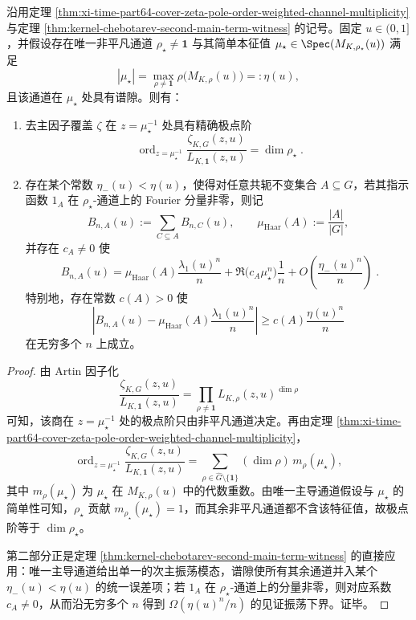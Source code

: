 \begin{theorem}[主导非平凡通道的极点阶与见证振荡]\label{thm:xi-time-part64ac-dominant-channel-pole-order-witness-oscillation}
沿用定理 \ref{thm:xi-time-part64-cover-zeta-pole-order-weighted-channel-multiplicity} 与定理 \ref{thm:kernel-chebotarev-second-main-term-witness} 的记号。固定 \(u\in(0,1]\)，并假设存在唯一非平凡通道 \(\rho_\star\neq \mathbf{1}\) 与其简单本征值 \(\mu_\star\in\Spec(M_{K,\rho_\star}(u))\) 满足
\[
|\mu_\star|
=
\max_{\rho\neq \mathbf{1}}\rho\!\bigl(M_{K,\rho}(u)\bigr)
=:\eta(u),
\]
且该通道在 \(\mu_\star\) 处具有谱隙。则有：
\begin{enumerate}
  \item 去主因子覆盖 \(\zeta\) 在 \(z=\mu_\star^{-1}\) 处具有精确极点阶
  \[
  \boxed{\;
  \operatorname{ord}_{z=\mu_\star^{-1}}
  \frac{\zeta_{K,G}(z,u)}{L_{K,\mathbf{1}}(z,u)}
  =
  \dim\rho_\star\; }.
  \]
  \item 存在某个常数 \(\eta_-(u)<\eta(u)\)，使得对任意共轭不变集合 \(A\subseteq G\)，若其指示函数 \(1_A\) 在 \(\rho_\star\)-通道上的 Fourier 分量非零，则记
  \[
  B_{n,A}(u):=\sum_{C\subseteq A}B_{n,C}(u),
  \qquad
  \mu_{\mathrm{Haar}}(A):=\frac{|A|}{|G|},
  \]
  并存在 \(c_A\neq 0\) 使
  \[
  \boxed{\;
  B_{n,A}(u)
  =
  \mu_{\mathrm{Haar}}(A)\frac{\lambda_1(u)^n}{n}
  +
  \Re\!\bigl(c_A\mu_\star^n\bigr)\frac1n
  +
  O\!\left(\frac{\eta_-(u)^n}{n}\right)\; }.
  \]
  特别地，存在常数 \(c(A)>0\) 使
  \[
  \boxed{\;
  \left|B_{n,A}(u)-\mu_{\mathrm{Haar}}(A)\frac{\lambda_1(u)^n}{n}\right|
  \ge
  c(A)\frac{\eta(u)^n}{n}\; }
  \]
  在无穷多个 \(n\) 上成立。
\end{enumerate}
\end{theorem}
\begin{proof}
由 Artin 因子化
\[
\frac{\zeta_{K,G}(z,u)}{L_{K,\mathbf{1}}(z,u)}
=
\prod_{\rho\neq \mathbf{1}}L_{K,\rho}(z,u)^{\dim\rho}
\]
可知，该商在 \(z=\mu_\star^{-1}\) 处的极点阶只由非平凡通道决定。再由定理 \ref{thm:xi-time-part64-cover-zeta-pole-order-weighted-channel-multiplicity}，
\[
\operatorname{ord}_{z=\mu_\star^{-1}}
\frac{\zeta_{K,G}(z,u)}{L_{K,\mathbf{1}}(z,u)}
=
\sum_{\rho\in\widehat G\setminus\{\mathbf{1}\}}(\dim\rho)\,m_\rho(\mu_\star),
\]
其中 \(m_\rho(\mu_\star)\) 为 \(\mu_\star\) 在 \(M_{K,\rho}(u)\) 中的代数重数。由唯一主导通道假设与 \(\mu_\star\) 的简单性可知，\(\rho_\star\) 贡献 \(m_{\rho_\star}(\mu_\star)=1\)，而其余非平凡通道都不含该特征值，故极点阶等于 \(\dim\rho_\star\)。

第二部分正是定理 \ref{thm:kernel-chebotarev-second-main-term-witness} 的直接应用：唯一主导通道给出单一的次主振荡模态，谱隙使所有其余通道并入某个 \(\eta_-(u)<\eta(u)\) 的统一误差项；若 \(1_A\) 在 \(\rho_\star\)-通道上的分量非零，则对应系数 \(c_A\neq 0\)，从而沿无穷多个 \(n\) 得到 \(\Omega(\eta(u)^n/n)\) 的见证振荡下界。证毕。
\end{proof}

